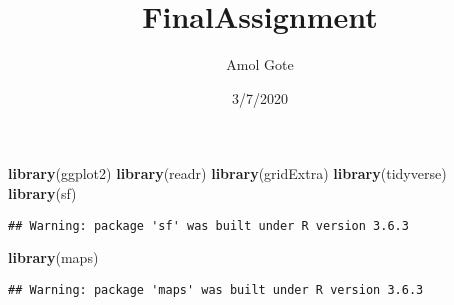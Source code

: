 \documentclass[]{article}
\title{FinalAssignment}
\author{Amol Gote}
\date{3/7/2020}
\newenvironment{Shaded}{\begin{snugshade}}{\end{snugshade}}
\newcommand{\KeywordTok}[1]{\textcolor[rgb]{0.13,0.29,0.53}{\textbf{#1}}}
\newcommand{\NormalTok}[1]{#1}
\begin{document}
\maketitle

\begin{Shaded}
\begin{Highlighting}[]
\KeywordTok{library}\NormalTok{(ggplot2) }
\KeywordTok{library}\NormalTok{(readr) }
\KeywordTok{library}\NormalTok{(gridExtra)}
\KeywordTok{library}\NormalTok{(tidyverse)}
\KeywordTok{library}\NormalTok{(sf)}
\end{Highlighting}
\end{Shaded}

\begin{verbatim}
## Warning: package 'sf' was built under R version 3.6.3
\end{verbatim}

\begin{Shaded}
\begin{Highlighting}[]
\KeywordTok{library}\NormalTok{(maps)}
\end{Highlighting}
\end{Shaded}

\begin{verbatim}
## Warning: package 'maps' was built under R version 3.6.3
\end{verbatim}
\end{document}
